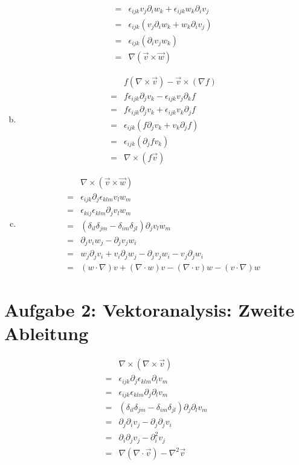 \documentclass[a4paper,german,12pt,smallheadings]{scrartcl}
\begin{document}
\begin{enumerate}[a)]
\begin{align}
      =  &\epsilon_{ijk} v_j \partial_i w_k + \epsilon_{ijk} w_k \partial_i v_j \\
      =  &\epsilon_{ijk} (v_j \partial_i w_k + w_k \partial_i v_j) \\
      =  &\epsilon_{ijk} (\partial_i v_j w_k) \\
      =  &\nabla (\vec{v} \times \vec{w})
    \end{align}
  \item
    \begin{align}
      &f(\nabla \times \vec{v}) - \vec{v} \times (\nabla f) \\
      = &f \epsilon_{ijk} \partial_j v_k - \epsilon_{ijk} v_j \partial_k f \\
      = &f \epsilon_{ijk} \partial_j v_k + \epsilon_{ijk} v_k \partial_j f \\
      = &\epsilon_{ijk} (f \partial_j v_k + v_k \partial_j f) \\
      = &\epsilon_{ijk} (\partial_j f v_k) \\
      = &\nabla \times (f \vec{v})
    \end{align}
  \item
    \begin{align}
      &\nabla \times (\vec{v} \times \vec{w}) \\
      = &\epsilon_{ijk} \partial_j \epsilon_{klm} v_l w_m \\
      = &\epsilon_{kij} \epsilon_{klm} \partial_j v_l w_m \\
      = &(\delta_{il} \delta_{jm} - \delta_{im} \delta_{jl}) \partial_j v_l w_m \\
      = &\partial_j v_i w_j - \partial_j v_j w_i \\
      = &w_j \partial_j v_i + v_i \partial_j w_j - \partial_j v_j w_i - v_j \partial_j w_i \\
      = &(w \cdot \nabla) v + (\nabla \cdot w) v - (\nabla \cdot v) w - (v \cdot \nabla) w
    \end{align}
\end{enumerate}

\section*{Aufgabe 2: Vektoranalysis: Zweite Ableitung}

\begin{align}
  &\nabla \times (\nabla \times \vec{v}) \\
  = &\epsilon_{ijk} \partial_j \epsilon_{klm} \partial_l v_m \\
  = &\epsilon_{ijk} \epsilon_{klm} \partial_j \partial_l v_m \\
  = &(\delta_{il} \delta_{jm} - \delta_{im} \delta_{jl}) \partial_j \partial_l v_m \\
  = &\partial_j \partial_i v_j - \partial_j \partial_j v_i \\
  = &\partial_i \partial_j v_j - \partial_i^2 v_j \\
  = &\nabla (\nabla \cdot \vec{v}) - \nabla^2 \vec{v}
\end{align}
\end{document}

